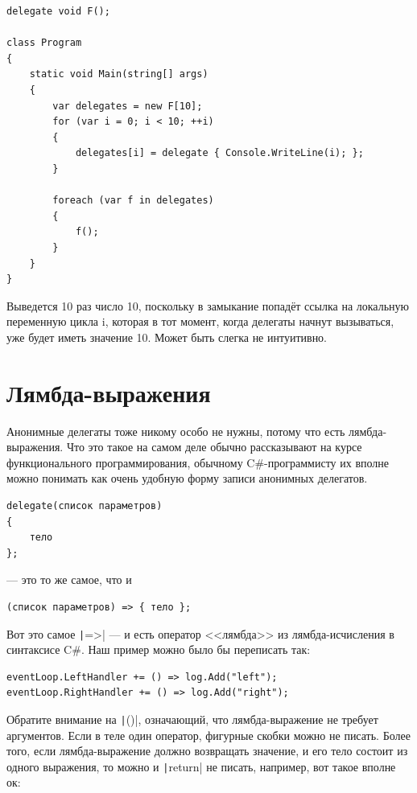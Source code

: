 \documentclass[a5paper]{article}
\begin{document}
\begin{verbatim}
delegate void F();

class Program
{
    static void Main(string[] args)
    {
        var delegates = new F[10];
        for (var i = 0; i < 10; ++i)
        {
            delegates[i] = delegate { Console.WriteLine(i); };
        }

        foreach (var f in delegates)
        {
            f();
        }
    }
}
\end{verbatim}

Выведется 10 раз число 10, поскольку в замыкание попадёт ссылка на локальную переменную цикла i, которая в тот момент, когда делегаты начнут вызываться, уже будет иметь значение 10. Может быть слегка не интуитивно.

\section{Лямбда-выражения}

Анонимные делегаты тоже никому особо не нужны, потому что есть лямбда-выражения. Что это такое на самом деле обычно рассказывают на курсе функционального программирования, обычному C\#-программисту их вполне можно понимать как очень удобную форму записи анонимных делегатов.

\begin{verbatim}
delegate(список параметров)
{
    тело
};
\end{verbatim}

--- это то же самое, что и 
\begin{verbatim}
(список параметров) => { тело };
\end{verbatim}

Вот это самое \texttt|=>| --- и есть оператор <<лямбда>> из лямбда-исчисления в синтаксисе C\#. Наш пример можно было бы переписать так:

\begin{verbatim}
eventLoop.LeftHandler += () => log.Add("left");
eventLoop.RightHandler += () => log.Add("right");
\end{verbatim}

Обратите внимание на \texttt|()|, означающий, что лямбда-выражение не требует аргументов. Если в теле один оператор, фигурные скобки можно не писать. Более того, если лямбда-выражение должно возвращать значение, и его тело состоит из одного выражения, то можно и \texttt|return| не писать, например, вот такое вполне ок:
\end{document}
